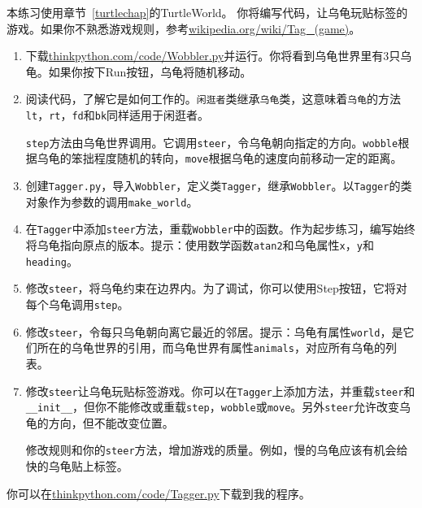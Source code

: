 \begin{ex}

本练习使用章节~\ref{turtlechap}的TurtleWorld。
你将编写代码，让乌龟玩贴标签的游戏。如果你不熟悉游戏规则，参考\url{wikipedia.org/wiki/Tag_(game)}。

\begin{enumerate}

\item 下载\url{thinkpython.com/code/Wobbler.py}并运行。你将看到乌龟世界里有3只乌龟。如果你按下{\sf Run}按钮，乌龟将随机移动。

\item 阅读代码，了解它是如何工作的。{\tt 闲逛者}类继承{\tt 乌龟}类，这意味着{\tt 乌龟}的方法{\tt lt}，{\tt rt}，{\tt fd}和{\tt bk}同样适用于闲逛者。

{\tt step}方法由乌龟世界调用。它调用{\tt steer}，令乌龟朝向指定的方向。{\tt wobble}根据乌龟的笨拙程度随机的转向，{\tt move}根据乌龟的速度向前移动一定的距离。


\item 创建{\tt Tagger.py}，导入{\tt Wobbler}，定义类{\tt Tagger}，继承{\tt Wobbler}。以{\tt Tagger}的类对象作为参数的调用\verb"make_world"。

\item 在{\tt Tagger}中添加{\tt steer}方法，重载{\tt Wobbler}中的函数。作为起步练习，编写始终将乌龟指向原点的版本。提示：使用数学函数{\tt atan2}和乌龟属性{\tt x}，{\tt y}和{\tt heading}。

\item 修改{\tt steer}，将乌龟约束在边界内。为了调试，你可以使用{\sf Step}按钮，它将对每个乌龟调用{\tt step}。

\item 修改{\tt steer}，令每只乌龟朝向离它最近的邻居。提示：乌龟有属性{\tt world}，是它们所在的乌龟世界的引用，而乌龟世界有属性{\tt animals}，对应所有乌龟的列表。

\item 修改{\tt steer}让乌龟玩贴标签游戏。你可以在{\tt Tagger}上添加方法，并重载{\tt steer}和\verb"__init__"，但你不能修改或重载{\tt step}，{\tt wobble}或{\tt move}。另外{\tt steer}允许改变乌龟的方向，但不能改变位置。

修改规则和你的{\tt steer}方法，增加游戏的质量。例如，慢的乌龟应该有机会给快的乌龟贴上标签。

\end{enumerate}

你可以在\url{thinkpython.com/code/Tagger.py}下载到我的程序。
\end{ex}


